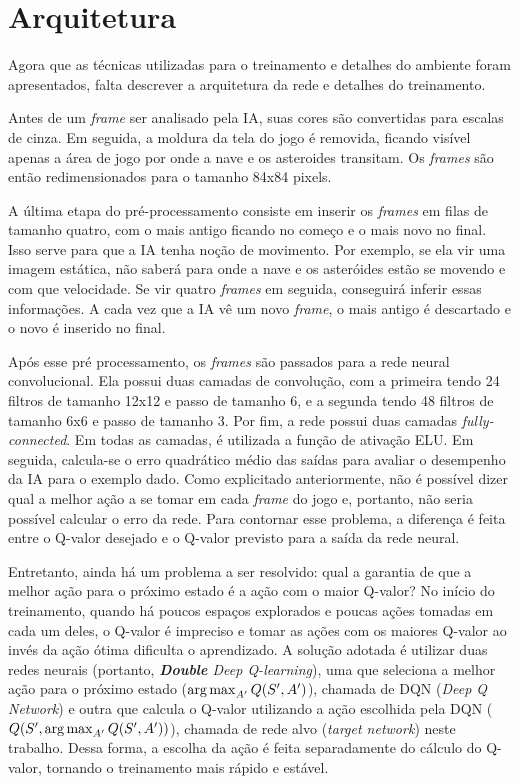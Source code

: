 \section{Arquitetura}
\label{sec:arq}


Agora que as técnicas utilizadas para o treinamento e detalhes do ambiente foram apresentados, falta descrever a arquitetura da rede e detalhes do treinamento.

Antes de um \textit{frame} ser analisado pela IA, suas cores são convertidas para escalas de cinza.
Em seguida, a moldura da tela do jogo é removida, ficando visível apenas a área de jogo por onde a nave e os asteroides transitam.
Os \textit{frames} são então redimensionados para o tamanho 84x84 pixels.

A última etapa do pré-processamento consiste em inserir os \textit{frames} em filas de tamanho quatro, com o mais antigo ficando no começo e o mais novo no final. Isso serve para que a IA tenha noção de movimento.
Por exemplo, se ela vir uma imagem estática, não saberá para onde a nave e os asteróides estão se movendo e com que velocidade.
Se vir quatro \textit{frames} em seguida, conseguirá inferir essas informações.
A cada vez que a IA vê um novo \textit{frame}, o mais antigo é descartado e o novo é inserido no final.

Após esse pré processamento, os \textit{frames} são passados para a rede neural convolucional.
Ela possui duas camadas de convolução, com a primeira tendo 24 filtros de tamanho 12x12 e passo de tamanho 6, e a segunda tendo 48 filtros de tamanho 6x6 e passo de tamanho 3.
Por fim, a rede possui duas camadas \textit{fully-connected}.
Em todas as camadas, é utilizada a função de ativação ELU.
Em seguida, calcula-se o erro quadrático médio das saídas para avaliar o desempenho da IA para o exemplo dado.
Como explicitado anteriormente, não é possível dizer qual a melhor ação a se tomar em cada \textit{frame} do jogo e, portanto, não seria possível calcular o erro da rede.
Para contornar esse problema, a diferença é feita entre o Q-valor desejado
e o Q-valor previsto para a saída da rede neural.

Entretanto, ainda há um problema a ser resolvido: qual a garantia de que a melhor ação para o próximo estado é a ação com o maior Q-valor?
No início do treinamento, quando há poucos espaços explorados e poucas ações tomadas em cada um deles, o Q-valor é impreciso e tomar as ações com os maiores Q-valor ao invés da ação ótima dificulta o aprendizado.
A solução adotada é utilizar duas redes neurais (portanto, \textit{\textbf{Double} Deep Q-learning}), uma que seleciona a melhor ação para o próximo estado ($\operatorname*{arg\,max}_{A'}Q(S',A')$), chamada de DQN (\textit{Deep Q Network}) e outra que calcula o Q-valor utilizando a ação escolhida pela DQN ($Q(S', \operatorname*{arg\,max}_{A'}Q(S',A'))$), chamada de rede alvo (\textit{target network}) neste trabalho. Dessa forma, a escolha da ação é feita separadamente do cálculo do Q-valor, tornando o treinamento mais rápido e estável.

